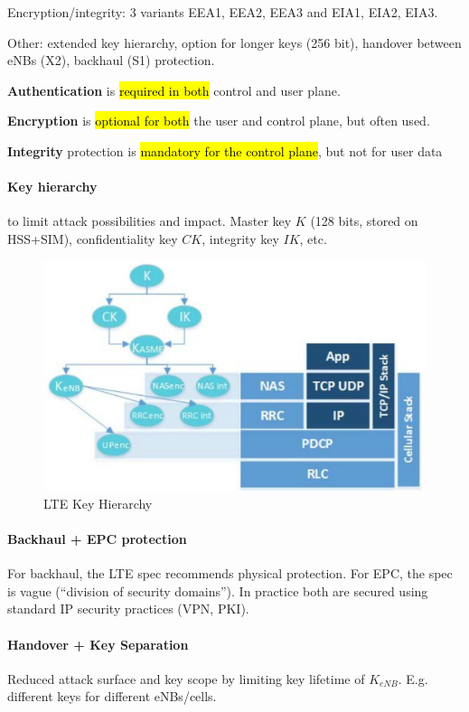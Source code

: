 Encryption/integrity: 3 variants EEA1, EEA2, EEA3 and EIA1, EIA2, EIA3.

Other: extended key hierarchy, option for longer keys (256 bit), handover
between eNBs (X2), backhaul (S1) protection.

\textbf{Authentication} is \hl{required in both} control and user plane.

\textbf{Encryption} is \hl{optional for both} the user and control plane,
but often used.

\textbf{Integrity} protection is \hl{mandatory for the control plane}, but
not for user data

\paragraph{Key hierarchy}
to limit attack possibilities and impact. Master key $K$ (128 bits, stored on
HSS+SIM), confidentiality key $CK$, integrity key $IK$, etc.
\begin{figure}
	\centering
	\includegraphics[scale=0.5]{images/10-4g-key-hierarchy.png}
	\caption{LTE Key Hierarchy}
	\label{fig:4g-key-hierarchy}
\end{figure}

\paragraph{Backhaul + EPC protection}
For backhaul, the LTE spec recommends physical protection. For EPC, the spec is
vague (``division of security domains''). In practice both are secured using
standard IP security practices (VPN, PKI).

\paragraph{Handover + Key Separation}
Reduced attack surface and key scope by limiting key lifetime of $K_{eNB}$.
E.g. different keys for different eNBs/cells.

